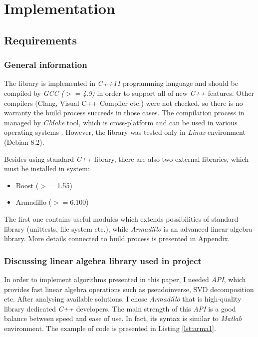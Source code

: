 \chapter{Implementation}

\section{Requirements}

\subsection{General information}
The library is implemented in \textit{C++11} programming language and should be compiled by \textit{GCC ($>=$4.9)} in order to support all of new \textit{C++} features. Other compilers (Clang, Visual C++ Compiler etc.) were not checked, so there is no warranty the build process succeeds in those cases.  The compilation process in managed by \textit{CMake} tool, which is cross-platform and can be used in various operating systems \cite{CMake}. However, the library was tested only in \textit{Linux} environment (Debian 8.2). 

Besides using standard \textit{C++} library, there are also two external libraries, which must be installed in system: 

\begin{itemize}
    \item Boost ($>=$1.55)
    \item Armadillo ($>=$6.100)
\end{itemize}
The first one contains useful modules which extends possibilities of standard library (unittests, file system etc.), while \textit{Armadillo} is an advanced linear algebra library. More details connected to build process is presented in Appendix. 


\subsection{Discussing linear algebra library used in project}

In order to implement algorithms presented in this paper, I needed \textit{API}, which provides fast linear algebra operations such as pseudoinverse, SVD decomposition etc. After analysing available solutions, I chose \textit{Armadillo} that is high-quality library dedicated \textit{C++} developers. The main strength of this \textit{API} is a good balance between speed and ease of use. In fact, its syntax is similar to \textit{Matlab} environment. The example of code is presented in Listing \ref{lst:arma1}.

